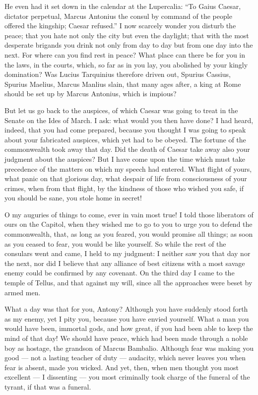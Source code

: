  He even had it set down in the calendar at the Lupercalia: ``To Gaius Caesar, dictator perpetual, Marcus Antonius the consul by command of the people offered the kingship; Caesar refused.'' I now scarcely wonder you disturb the peace; that you hate not only the city but even the daylight; that with the most desperate brigands you drink not only from day to day but from one day into the next. For where can you find rest in peace? What place can there be for you in the laws, in the courts, which, so far as in you lay, you abolished by your kingly domination? Was Lucius Tarquinius therefore driven out, Spurius Cassius, Spurius Maelius, Marcus Manlius slain, that many ages after, a king at Rome should be set up by Marcus Antonius, which is impious?

 But let us go back to the auspices, of which Caesar was going to treat in the Senate on the Ides of March. I ask: what would you then have done? I had heard, indeed, that you had come prepared, because you thought I was going to speak about your fabricated auspices, which yet had to be obeyed. The fortune of the commonwealth took away that day. Did the death of Caesar take away also your judgment about the auspices? But I have come upon the time which must take precedence of the matters on which my speech had entered. What flight of yours, what panic on that glorious day, what despair of life from consciousness of your crimes, when from that flight, by the kindness of those who wished you safe, if you should be sane, you stole home in secret!

 O my auguries of things to come, ever in vain most true! I told those liberators of ours on the Capitol, when they wished me to go to you to urge you to defend the commonwealth, that, as long as you feared, you would promise all things; as soon as you ceased to fear, you would be like yourself. So while the rest of the consulars went and came, I held to my judgment: I neither saw you that day nor the next, nor did I believe that any alliance of best citizens with a most savage enemy could be confirmed by any covenant. On the third day I came to the temple of Tellus, and that against my will, since all the approaches were beset by armed men.

 What a day was that for you, Antony? Although you have suddenly stood forth as my enemy, yet I pity you, because you have envied yourself. What a man you would have been, immortal gods, and how great, if you had been able to keep the mind of that day! We should have peace, which had been made through a noble boy as hostage, the grandson of Marcus Bambalio. Although fear was making you good --- not a lasting teacher of duty --- audacity, which never leaves you when fear is absent, made you wicked. And yet, then, when men thought you most excellent --- I dissenting --- you most criminally took charge of the funeral of the tyrant, if that was a funeral.

